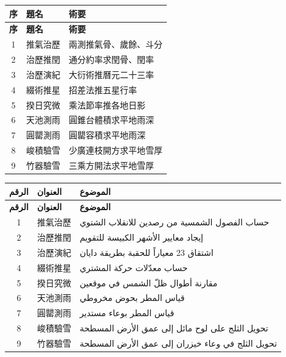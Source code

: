 \documentclass[11pt,a4paper]{article}
\begin{document}
\noindent
\begin{minipage}[t]{0.48\textwidth}
\begin{longtable}{|c|l|p{5cm}|}
\hline
\textbf{序} & \textbf{題名} & \textbf{術要} \\
\hline
\endfirsthead
\hline
\textbf{序} & \textbf{題名} & \textbf{術要} \\
\hline
\endhead
1 & 推氣治歷 & 兩測推氣骨、歲餘、斗分 \\
\hline
2 & 治歷推閏 & 通分約率求閏骨、閏率 \\
\hline
3 & 治歷演紀 & 大衍術推曆元二十三率 \\
\hline
4 & 綴術推星 & 招差法推五星行率 \\
\hline
5 & 揆日究微 & 乘法節率推各地日影 \\
\hline
6 & 天池測雨 & 圓錐台體積求平地雨深 \\
\hline
7 & 圓罌測雨 & 圓罌容積求平地雨深 \\
\hline
8 & 峻積驗雪 & 少廣連枝開方求平地雪厚 \\
\hline
9 & 竹器驗雪 & 三乘方開法求平地雪厚 \\
\hline
\end{longtable}
\end{minipage}
\hfill
\begin{minipage}[t]{0.48\textwidth}
\arabicfont\beginR
\begin{longtable}{|c|l|p{5.5cm}|}
\hline
\textbf{الرقم} & \textbf{العنوان} & \textbf{الموضوع} \\
\hline
\endfirsthead
\hline
\textbf{الرقم} & \textbf{العنوان} & \textbf{الموضوع} \\
\hline
\endhead
1 & 推氣治歷 & حساب الفصول الشمسية من رصدين للانقلاب الشتوي \\
\hline
2 & 治歷推閏 & إيجاد معايير الأشهر الكبيسة للتقويم \\
\hline
3 & 治歷演紀 & اشتقاق 23 معياراً للحقبة بطريقة دايان \\
\hline
4 & 綴術推星 & حساب معدّلات حركة المشتري \\
\hline
5 & 揆日究微 & مقارنة أطوال ظلّ الشمس في موقعين \\
\hline
6 & 天池測雨 & قياس المطر بحوض مخروطي \\
\hline
7 & 圓罌測雨 & قياس المطر بوعاء مستدير \\
\hline
8 & 峻積驗雪 & تحويل الثلج على لوح مائل إلى عمق الأرض المسطحة \\
\hline
9 & 竹器驗雪 & تحويل الثلج في وعاء خيزران إلى عمق الأرض المسطحة \\
\hline
\end{longtable}
\endR
\end{minipage}
\end{document}
